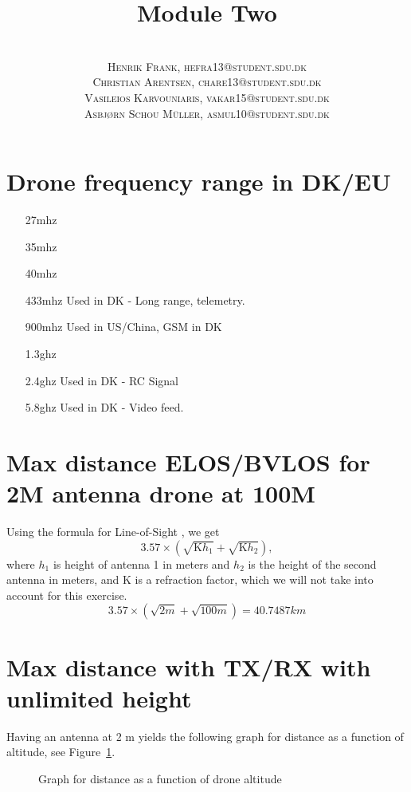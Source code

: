 \documentclass[paper=letter, fontsize=10pt]{article}
\title{\vspace{-15mm}\fontsize{24pt}{10pt}\selectfont\textbf{Module Two }} %
\author{
\large
{\textsc{}}\\[2mm]
{\textsc{Henrik Frank, hefra13@student.sdu.dk }}\\[2mm]
{\textsc{Christian Arentsen, chare13@student.sdu.dk }}\\[2mm]
{\textsc{Vasileios Karvouniaris, vakar15@student.sdu.dk }}\\[2mm]
{\textsc{Asbjørn Schou Müller, asmul10@student.sdu.dk }}
}
\date{}
\begin{document}
\maketitle %
\thispagestyle{fancy} %



\section{Drone frequency range in DK/EU}
\begin{enumerate}
\item[27mhz]
\item[35mhz]
\item[40mhz]
\item[433mhz] Used in DK - Long range, telemetry.
\item[900mhz] Used in US/China, GSM in DK
\item[1.3ghz]
\item[2.4ghz] Used in DK - RC Signal
\item[5.8ghz] Used in DK - Video feed.
\end{enumerate}

\section{Max distance ELOS/BVLOS for 2M antenna drone at 100M}
Using the formula for Line-of-Sight \cite{los_estimation}, we get 
\begin{equation}
3.57\times(\sqrt{\text{K}h_{1}} + \sqrt{\text{K}h_{2}}),
\end{equation}
where $h_{1}$ is height of antenna 1 in meters and $h_{2}$ is the height of the second antenna in meters, and K is a refraction factor, which we will not take into account for this exercise.
\begin{equation}
3.57\times(\sqrt{2m} + \sqrt{100m}) = 40.7487 km
\end{equation}

\section{Max distance with TX/RX with unlimited height}
Having an antenna at 2 m yields the following graph for distance as a function of altitude, see Figure~\ref{fig_maxdist}.
\begin{figure}
\centering
{}
\caption{Graph for distance as a function of drone altitude}
\label{fig_maxdist}
\end{figure}
\end{document}
